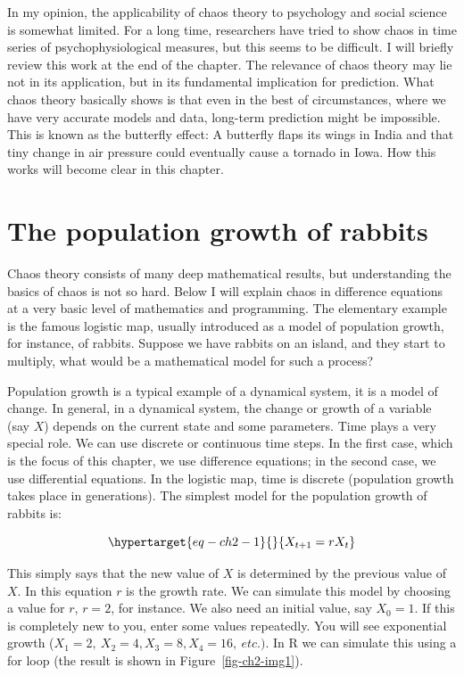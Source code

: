 \documentclass[
  a4paper,
  DIV=11,
  numbers=noendperiod,
  oneside]{scrreprt}
\begin{document}
In my opinion, the applicability of chaos theory to psychology and
social science is somewhat limited. For a long time, researchers have
tried to show chaos in time series of psychophysiological measures, but
this seems to be difficult. I will briefly review this work at the end
of the chapter. The relevance of chaos theory may lie not in its
application, but in its fundamental implication for prediction. What
chaos theory basically shows is that even in the best of circumstances,
where we have very accurate models and data, long-term prediction might
be impossible. This is known as the butterfly effect: A butterfly flaps
its wings in India and that tiny change in air pressure could eventually
cause a tornado in Iowa. How this works will become clear in this
chapter.

\hypertarget{sec-The-population-growth-of-rabbits}{%
\section{The population growth of
rabbits}\label{sec-The-population-growth-of-rabbits}}

Chaos theory consists of many deep mathematical results, but
understanding the basics of chaos is not so hard. Below I will explain
chaos in difference equations at a very basic level of mathematics and
programming. The elementary example is the famous logistic map, usually
introduced as a model of population growth, for instance, of rabbits.
Suppose we have rabbits on an island, and they start to multiply, what
would be a mathematical model for such a process?

Population growth is a typical example of a dynamical system, it is a
model of change. In general, in a dynamical system, the change or growth
of a variable (say \(X\)) depends on the current state and some
parameters. Time plays a very special role. We can use discrete or
continuous time steps. In the first case, which is the focus of this
chapter, we use difference equations; in the second case, we use
differential equations. In the logistic map, time is discrete
(population growth takes place in generations). The simplest model for
the population growth of rabbits is:

\begin{equation}\protect\hypertarget{eq-ch2-1}{}{
X_{t + 1} = rX_{t}}\label{eq-ch2-1}\end{equation}

This simply says that the new value of \(X\) is determined by the
previous value of \(X\). In this equation \(r\) is the growth rate. We
can simulate this model by choosing a value for \(r\), \(r=2\), for
instance. We also need an initial value, say \(X_{0} = 1.\) If this is
completely new to you, enter some values repeatedly. You will see
exponential growth
(\(X_{1} = 2,\ X_{2} = 4,X_{3} = 8,X_{4} = 16,\ etc.)\). In R we can
simulate this using a for loop (the result is shown in
Figure~\ref{fig-ch2-img1}).
\end{document}
